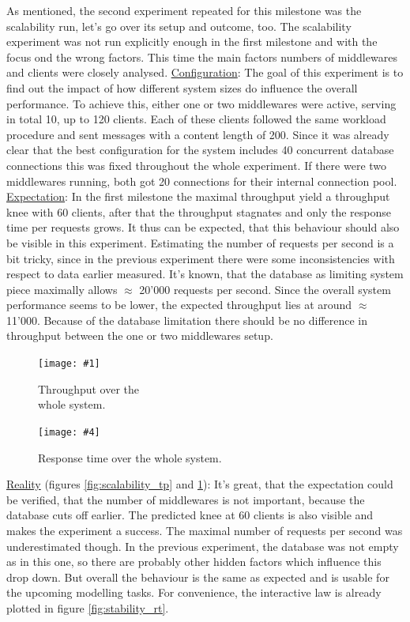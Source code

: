 \documentclass[11pt]{article}
\newcommand\TwoFig[6]{%
	\sbox\IBoxA{\texttt{[image: \#1]}}
	\sbox\IBoxB{\texttt{[image: \#4]}}%
	\ifdim\ht\IBoxA>\ht\IBoxB
	\setlength\IHeight{\ht\IBoxB}\else\setlength\IHeight{\ht\IBoxA}\fi%
	\begin{figure}[!htb]
		\minipage[t]{0.5\textwidth}\centering
		\texttt{[image: \#1]}
		\caption{#2}\label{#3}
		\endminipage \hfill
		\minipage[t]{0.5\textwidth}\centering
		\texttt{[image: \#4]}
		\caption{#5}\label{#6}
		\endminipage
	\end{figure}%
}
\begin{document}
As mentioned, the second experiment repeated for this milestone was the scalability run, let's go over its setup and outcome, too. The scalability experiment was not run explicitly enough in the first milestone and with the focus ond the wrong factors. This time the main factors numbers of middlewares and clients were closely analysed.
\newline\underline{Configuration}: The goal of this experiment is to find out the impact of how different system sizes do influence the overall performance. To achieve this, either one or two middlewares were active, serving in total 10, up to 120 clients. Each of these clients followed the same workload procedure and sent messages with a content length of 200. Since it was already clear that the best configuration for the system includes 40 concurrent database connections this was fixed throughout the whole experiment. If there were two middlewares running, both got 20 connections for their internal connection pool. 
\newline\underline{Expectation}: In the first milestone the maximal throughput yield a throughput knee with 60 clients, after that the throughput stagnates and only the response time per requests grows. It thus can be expected, that this behaviour should also be visible in this experiment. Estimating the number of requests per second is a bit tricky, since in the previous experiment there were some inconsistencies with respect to data earlier measured. It's known, that the database as limiting system piece maximally allows $\approx$ 20'000 requests per second. Since the overall system performance seems to be lower, the expected throughput lies at around $\approx$ 11'000. Because of the database limitation there should be no difference in throughput between the one or two middlewares setup.
\TwoFig {figures/scalability/tp} {Throughput over the\\ whole system.} {fig:scalability_tp}
		{figures/scalability/rt} {Response time over the whole system.} {fig:scalability_rt}	
\newline\underline{Reality} (figures \ref{fig:scalability_tp} and \ref{fig:scalability_rt}): It's great, that the expectation could be verified, that the number of middlewares is not important, because the database cuts off earlier. The predicted knee at 60 clients is also visible and makes the experiment a success. The maximal number of requests per second was underestimated though. In the previous experiment, the database was not empty as in this one, so there are probably other hidden factors which influence this drop down. But overall the behaviour is the same as expected and is usable for the upcoming modelling tasks. For convenience, the interactive law is already plotted in figure \ref{fig:stability_rt}.
\end{document}
